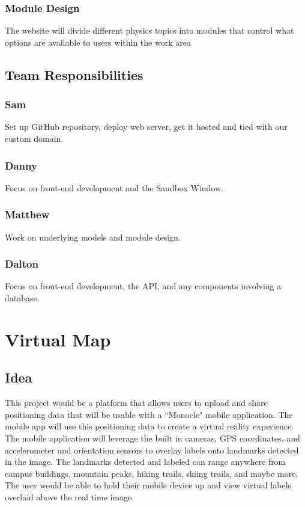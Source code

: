 \documentclass[pdftex,11pt,a4paper]{article}
\begin{document}
\subsubsection{Module Design}
The website will divide different physics topics into modules that control what options are available to users within the work area

\subsection{Team Responsibilities}
\subsubsection{Sam}
Set up GitHub repository, deploy web server, get it hosted and tied with our custom domain.

\subsubsection{Danny}
Focus on front-end development and the Sandbox Window.

\subsubsection{Matthew}
Work on underlying models and module design.

\subsubsection{Dalton}
Focus on front-end development, the API, and any components involving a database.

\clearpage

\section{Virtual Map}
\subsection{Idea}
This project would be a platform that allows users to upload and share positioning data that will be usable with a ``Monocle" mobile application. The mobile app will use this positioning data to create a virtual reality experience. The mobile application will leverage the built in cameras, GPS coordinates, and accelerometer and orientation sensors to overlay labels onto landmarks detected in the image. The landmarks detected and labeled can range anywhere from campus buildings, mountain peaks, hiking trails, skiing trails, and maybe more. The user would be able to hold their mobile device up and view virtual labels overlaid above the real time image.
\end{document}
